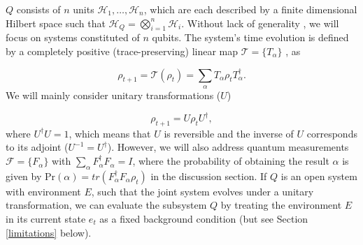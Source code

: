 \documentclass[preprints, article, accept, pdftex, moreauthors, letterpaper]{Definitions/mdpi}
\renewcommand{\=}[1]{\stackrel{#1}{=}} %
\renewcommand{\P}{\text{Pr}} %
\renewcommand{\H}{\mathcal{H}} %
\newcommand{\T}{\mathcal{T}} %
\renewcommand{\*}{\otimes}%
\begin{document}
$Q$ consists of $n$ units $\H_1, \dots, \H_n$, which are each described by a finite dimensional Hilbert space such that $\H_Q = \bigotimes_{i=1}^n \H_i$. Without lack of generality \cite{Gomez2021}, we will focus on systems constituted of $n$ qubits. 
The system's time evolution is defined by a completely positive (trace-preserving) linear map $\T = \{T_\alpha\}$ \cite{Vedral2002}, as

\begin{equation}
\label{eq:trans}
    \rho_{t+1} = \T(\rho_t) =  \sum_\alpha T_\alpha \rho_t T_\alpha ^\dag.
\end{equation}
%
We will mainly consider unitary transformations ($U$)

\begin{equation}
\label{eq:unitary}
    \rho_{t+1} = U \rho_t U^\dag, %
\end{equation}
%
%
where $U^\dag U = 1$, which means that $U$ is reversible and the inverse of $U$ corresponds to its adjoint ($U^{-1} = U^\dag$). However, we will also address quantum measurements $\mathcal{F} = \{F_\alpha\}$ with $\sum_\alpha F_\alpha^\dag F_\alpha = I$, where the probability of obtaining the result $\alpha$ is given by $\P(\alpha) = tr(F_\alpha^\dag F_\alpha \rho_t)$ in the discussion section.
If $Q$ is an open system with environment $E$, such that the joint system evolves under a unitary transformation, we can evaluate the subsystem $Q$ by treating the environment $E$ in its current state $e_t$ as a fixed background condition (but see Section \ref{limitations} below).  
\end{document}
